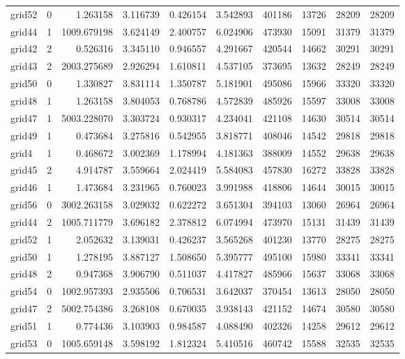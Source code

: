 \documentclass[../../../thesis.tex]{subfiles}
\begin{document}
\begin{longtable}{|l|r|r|r|r|r|r|r|r|r|}
grid52 & 0 & 1.263158 & 3.116739 & 0.426154 & 3.542893 & 401186 & 13726 & 28209 & 28209 \\
grid44 & 1 & 1009.679198 & 3.624149 & 2.400757 & 6.024906 & 473930 & 15091 & 31379 & 31379 \\
grid42 & 2 & 0.526316 & 3.345110 & 0.946557 & 4.291667 & 420544 & 14662 & 30291 & 30291 \\
grid43 & 2 & 2003.275689 & 2.926294 & 1.610811 & 4.537105 & 373695 & 13632 & 28249 & 28249 \\
grid50 & 0 & 1.330827 & 3.831114 & 1.350787 & 5.181901 & 495086 & 15966 & 33320 & 33320 \\
grid48 & 1 & 1.263158 & 3.804053 & 0.768786 & 4.572839 & 485926 & 15597 & 33008 & 33008 \\
grid47 & 1 & 5003.228070 & 3.303724 & 0.930317 & 4.234041 & 421108 & 14630 & 30514 & 30514 \\
grid49 & 1 & 0.473684 & 3.275816 & 0.542955 & 3.818771 & 408046 & 14542 & 29818 & 29818 \\
grid4 & 1 & 0.468672 & 3.002369 & 1.178994 & 4.181363 & 388009 & 14552 & 29638 & 29638 \\
grid45 & 2 & 4.914787 & 3.559664 & 2.024419 & 5.584083 & 457830 & 16272 & 33828 & 33828 \\
grid46 & 1 & 1.473684 & 3.231965 & 0.760023 & 3.991988 & 418806 & 14644 & 30015 & 30015 \\
grid56 & 0 & 3002.263158 & 3.029032 & 0.622272 & 3.651304 & 394103 & 13060 & 26964 & 26964 \\
grid44 & 2 & 1005.711779 & 3.696182 & 2.378812 & 6.074994 & 473970 & 15131 & 31439 & 31439 \\
grid52 & 1 & 2.052632 & 3.139031 & 0.426237 & 3.565268 & 401230 & 13770 & 28275 & 28275 \\
grid50 & 1 & 1.278195 & 3.887127 & 1.508650 & 5.395777 & 495100 & 15980 & 33341 & 33341 \\
grid48 & 2 & 0.947368 & 3.906790 & 0.511037 & 4.417827 & 485966 & 15637 & 33068 & 33068 \\
grid54 & 0 & 1002.957393 & 2.935506 & 0.706531 & 3.642037 & 370454 & 13613 & 28050 & 28050 \\
grid47 & 2 & 5002.754386 & 3.268108 & 0.670035 & 3.938143 & 421152 & 14674 & 30580 & 30580 \\
grid51 & 1 & 0.774436 & 3.103903 & 0.984587 & 4.088490 & 402326 & 14258 & 29612 & 29612 \\
grid53 & 0 & 1005.659148 & 3.598192 & 1.812324 & 5.410516 & 460742 & 15588 & 32535 & 32535 \\

\end{longtable}
\end{document}
